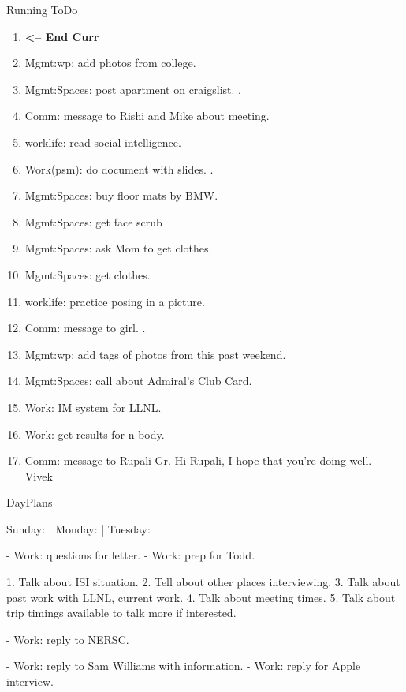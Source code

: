 \begin{columns}
\begin{column}{0.6\linewidth}
\begin{block}{Running ToDo}
\begin{enumerate}
      \item \tiny \textbf{ <-- End Curr }
      \item \tiny Mgmt:wp: add photos from college.
      \item \tiny Mgmt:Spaces: post apartment on craigslist. .
      \item \tiny Comm: message to Rishi and Mike about meeting. 
      \item \tiny worklife: read social intelligence.  
      \item \tiny Work(psm): do document with slides. .
      \item \tiny Mgmt:Spaces: buy floor mats by BMW. 
      \item \tiny Mgmt:Spaces: get face scrub
      \item \tiny Mgmt:Spaces: ask Mom to get clothes.
      \item \tiny Mgmt:Spaces: get clothes. 
      \item \tiny worklife: practice posing in a picture.  
      \item \tiny Comm: message to girl.  . 
      \item \tiny Mgmt:wp: add tags of photos from this past weekend.  
      \item \tiny Mgmt:Spaces: call about Admiral's Club Card.
      \item \tiny Work: IM system for LLNL. 
      \item \tiny Work: get results for n-body. 
      \item \tiny Comm: message to Rupali Gr. 
        Hi Rupali, I hope that you're doing well. -Vivek

      \end{enumerate}
    \end{block} 


\begin{block}{DayPlans} 

  Sunday:   
  | Monday: 
  | Tuesday: 

  - Work: questions for letter. 
  - Work: prep for Todd. 

1. Talk about ISI situation.
2. Tell about other places interviewing. 
3. Talk about past work with LLNL, current work. 
4. Talk about meeting times. 
5. Talk about trip timings available to talk more if interested. 


  - Work: reply to NERSC. 

  - Work: reply to Sam Williams with information. 
  - Work: reply for Apple interview.


\end{block}
\end{column}
\end{columns}

